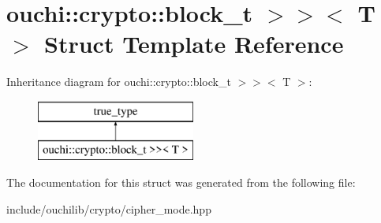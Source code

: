 \hypertarget{structouchi_1_1crypto_1_1is__crypto__algorithm_3_01_t_00_01std_1_1void__t_3_01decltype_07_t_1_1e5df830464ccc37e231670f275f2fa0d7}{}\section{ouchi\+::crypto\+::block\+\_\+t $>$$>$$<$ T $>$ Struct Template Reference}
\label{structouchi_1_1crypto_1_1is__crypto__algorithm_3_01_t_00_01std_1_1void__t_3_01decltype_07_t_1_1e5df830464ccc37e231670f275f2fa0d7}
Inheritance diagram for ouchi\+::crypto\+::block\+\_\+t $>$$>$$<$ T $>$\+:\begin{figure}[H]
\begin{center}
\leavevmode
\includegraphics[height=2.000000cm]{structouchi_1_1crypto_1_1is__crypto__algorithm_3_01_t_00_01std_1_1void__t_3_01decltype_07_t_1_1e5df830464ccc37e231670f275f2fa0d7}
\end{center}
\end{figure}


The documentation for this struct was generated from the following file\+:\begin{DoxyCompactItemize}
\item 
include/ouchilib/crypto/cipher\+\_\+mode.\+hpp\end{DoxyCompactItemize}
